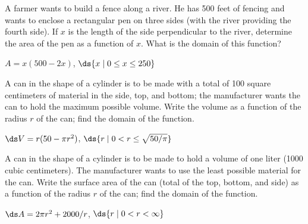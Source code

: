 \begin{enumialphparenastyle}
\begin{ex}
A farmer wants to build a fence along a river.  He has
500 feet of fencing and wants to enclose a rectangular pen on three
sides (with the river providing the fourth side).  If $x$ is the
length of the side perpendicular to the river, determine the area of
the pen as a function of $x$.  What is the domain of this function?
\begin{sol}
$A=x(500-2x)$, $\ds \{x\mid 0\le x\le 250\}$
\end{sol}
\end{ex}

\begin{ex}
A can in the shape of a cylinder is to be made with a total
of 100 square centimeters of material in the side, top, and bottom;
the manufacturer wants the can to hold the maximum possible
volume. Write the volume as a function of the radius $r$ of the can;
find the domain of the function.
\begin{sol}
$\ds V=r(50-\pi r^2)$, $\ds \{r\mid 0< r\le \sqrt{50/\pi}\}$
\end{sol}
\end{ex}

\begin{ex}
A can in the shape of a cylinder is to be made to hold a
volume of one liter (1000 cubic centimeters). The manufacturer wants
to use the least possible material for the can. Write the surface area
of the can (total of the top, bottom, and side) as a function of the
radius $r$ of the can; find the domain of the function.
\begin{sol}
$\ds A=2\pi r^2+2000/r$, $\ds \{r\mid 0<r<\infty\}$
\end{sol}
\end{ex}

\end{enumialphparenastyle}